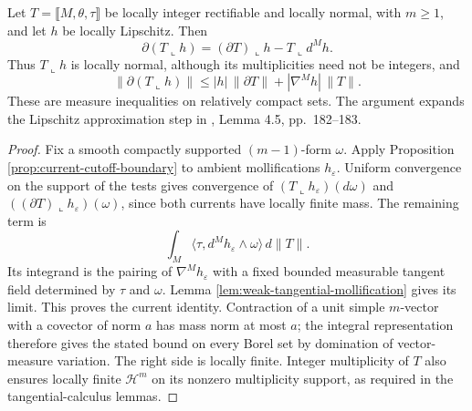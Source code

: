 \begin{proposition}\label{prop:lipschitz-rectifiable-product-rule}
Let $T=\llbracket M,\theta,\tau\rrbracket$ be locally integer rectifiable and locally normal, with $m\geq1$, and let $h$ be locally Lipschitz. Then
\[
 \partial(T\llcorner h)=(\partial T)\llcorner h-T\llcorner d^Mh.
\]
Thus $T\llcorner h$ is locally normal, although its multiplicities need not be integers, and
\[
 \|\partial(T\llcorner h)\|
 \leq |h|\,\|\partial T\|+|\nabla^Mh|\,\|T\|.
\]
These are measure inequalities on relatively compact sets. The argument expands the Lipschitz approximation step in \cite{Sim18}, Lemma 4.5, pp.~182--183.
\end{proposition}
\begin{proof}
Fix a smooth compactly supported $(m-1)$-form $\omega$. Apply Proposition \ref{prop:current-cutoff-boundary} to ambient mollifications $h_\varepsilon$. Uniform convergence on the support of the tests gives convergence of $(T\llcorner h_\varepsilon)(d\omega)$ and $((\partial T)\llcorner h_\varepsilon)(\omega)$, since both currents have locally finite mass. The remaining term is
\[
 \int_M\langle\tau,d^Mh_\varepsilon\wedge\omega\rangle\,d\|T\|.
\]
Its integrand is the pairing of $\nabla^Mh_\varepsilon$ with a fixed bounded measurable tangent field determined by $\tau$ and $\omega$. Lemma \ref{lem:weak-tangential-mollification} gives its limit. This proves the current identity. Contraction of a unit simple $m$-vector with a covector of norm $a$ has mass norm at most $a$; the integral representation therefore gives the stated bound on every Borel set by domination of vector-measure variation. The right side is locally finite. Integer multiplicity of $T$ also ensures locally finite $\mathcal H^m$ on its nonzero multiplicity support, as required in the tangential-calculus lemmas.
\end{proof}
